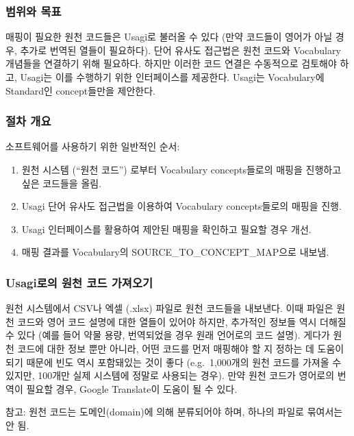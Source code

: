 \documentclass[11pt]{book}
\providecommand{\tightlist}{%
  \setlength{\itemsep}{0pt}\setlength{\parskip}{0pt}}
\theoremstyle{definition}
\theoremstyle{definition}
\theoremstyle{definition}
\theoremstyle{remark}
\begin{document}
\subsubsection*{범위와 목표}\label{--2}

매핑이 필요한 원천 코드들은 Usagi로 불러올 수 있다 (만약 코드들이 영어가
아닐 경우, 추가로 번역된 열들이 필요하다). 단어 유사도 접근법은 원천
코드와 Vocabulary 개념들을 연결하기 위해 필요하다. 하지만 이러한 코드
연결은 수동적으로 검토해야 하고, Usagi는 이를 수행하기 위한 인터페이스를
제공한다. Usagi는 Vocabulary에 Standard인 concept들만을 제안한다.

\subsubsection*{절차 개요}\label{--2}

소프트웨어를 사용하기 위한 일반적인 순서:

\begin{enumerate}
\def\labelenumi{\arabic{enumi}.}
\tightlist
\item
  원천 시스템 (``원천 코드'') 로부터 Vocabulary concepts들로의 매핑을
  진행하고 싶은 코드들을 올림.
\item
  Usagi 단어 유사도 접근법을 이용하여 Vocabulary concepts들로의 매핑을
  진행.
\item
  Usagi 인터페이스를 활용하여 제안된 매핑을 확인하고 필요할 경우 개선.
\item
  매핑 결과를 Vocabulary의 SOURCE\_TO\_CONCEPT\_MAP으로 내보냄.
\end{enumerate}

\subsubsection{Usagi로의 원천 코드 가져오기}\label{usagi---}

원천 시스템에서 CSV나 엑셀 (.xlsx) 파일로 원천 코드들을 내보낸다. 이때
파일은 원천 코드와 영어 코드 설명에 대한 열들이 있어야 하지만, 추가적인
정보들 역시 더해질 수 있다 (예를 들어 약물 용량, 번역되었을 경우 원래
언어로의 코드 설명). 게다가 원천 코드에 대한 정보 뿐만 아니라, 어떤
코드를 먼저 매핑해야 할 지 정하는 데 도움이 되기 때문에 빈도 역시
포함돼있는 것이 좋다 (e.g.~1,000개의 원천 코드를 가져올 수 있지만,
100개만 실제 시스템에 정말로 사용되는 경우). 만약 원천 코드가 영어로의
번역이 필요할 경우, Google Translate이 도움이 될 수 있다.

참고: 원천 코드는 도메인(domain)에 의해 분류되어야 하며, 하나의 파일로
묶여서는 안 됨.
\end{document}

